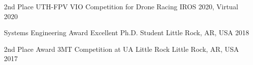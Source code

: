 



\begin{cvhonors}

\cvhonor
{2nd Place} %
{UTH-FPV VIO Competition for Drone Racing} %
{IROS 2020, Virtual} %
{2020} %

\cvhonor
	{Systems Engineering Award} %
	{Excellent Ph.D. Student} %
	{Little Rock, AR, USA} %
	{2018} %

  \cvhonor
	{2nd Place Award} %
	{3MT Competition at UA Little Rock} %
	{Little Rock, AR, USA} %
	{2017} %


%
%

\end{cvhonors}

